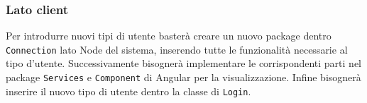 \subsubsection{Lato client}
Per introdurre nuovi tipi di utente basterà creare un nuovo package dentro \texttt{Connection} lato Node del sistema, inserendo tutte le funzionalità necessarie al tipo d'utente. Successivamente bisognerà implementare le corrispondenti parti nel package \texttt{Services} e \texttt{Component} di Angular per la visualizzazione. Infine bisognerà inserire il nuovo tipo di utente dentro la classe di \texttt{Login}.